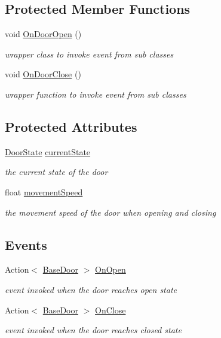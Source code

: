 \subsection*{Protected Member Functions}
\begin{DoxyCompactItemize}
\item 
void \mbox{\hyperlink{class_base_door_af53bd804dcee24b1f2019c2d2e8e03c6}{On\+Door\+Open}} ()
\begin{DoxyCompactList}\small\item\em wrapper class to invoke event from sub classes \end{DoxyCompactList}\item 
void \mbox{\hyperlink{class_base_door_a3ce14aa6aca622f9d18e7054e76ec8d2}{On\+Door\+Close}} ()
\begin{DoxyCompactList}\small\item\em wrapper function to invoke event from sub classes \end{DoxyCompactList}\end{DoxyCompactItemize}
\subsection*{Protected Attributes}
\begin{DoxyCompactItemize}
\item 
\mbox{\hyperlink{class_base_door_a22e038571daf23b362eb8aaedc78cb43}{Door\+State}} \mbox{\hyperlink{class_base_door_a79de3a0eaae4ea2749f384224dce6692}{current\+State}}
\begin{DoxyCompactList}\small\item\em the current state of the door \end{DoxyCompactList}\item 
float \mbox{\hyperlink{class_base_door_aace8dcf06aaae9d78ebd0d55931ab3e3}{movement\+Speed}}
\begin{DoxyCompactList}\small\item\em the movement speed of the door when opening and closing \end{DoxyCompactList}\end{DoxyCompactItemize}
\subsection*{Events}
\begin{DoxyCompactItemize}
\item 
Action$<$ \mbox{\hyperlink{class_base_door}{Base\+Door}} $>$ \mbox{\hyperlink{class_base_door_a88b84b3eafa96f6a3290b0aa5b55d9c0}{On\+Open}}
\begin{DoxyCompactList}\small\item\em event invoked when the door reaches open state \end{DoxyCompactList}\item 
Action$<$ \mbox{\hyperlink{class_base_door}{Base\+Door}} $>$ \mbox{\hyperlink{class_base_door_a382fd7054c500c9075ef67792f39eab5}{On\+Close}}
\begin{DoxyCompactList}\small\item\em event invoked when the door reaches closed state \end{DoxyCompactList}\end{DoxyCompactItemize}


